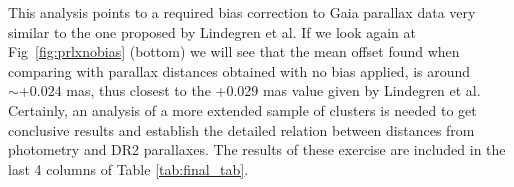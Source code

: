 \documentclass[draft]{aa}
\begin{document}
%
%
%


This analysis points to a required bias correction to Gaia parallax data
very similar to the one proposed by Lindegren et al. If we look again at
Fig~\ref{fig:prlxnobias} (bottom) we will see that the mean offset found when
comparing with parallax distances obtained with no bias applied, is around
$\sim+0.024$ mas, thus closest to the +0.029 mas value given by Lindegren et
al. Certainly, an analysis of a more extended sample of clusters is needed to
get conclusive results and establish the detailed relation between distances
from photometry and DR2 parallaxes. The results of these exercise are included
in the last 4 columns of Table \ref{tab:final_tab}.
\end{document}

